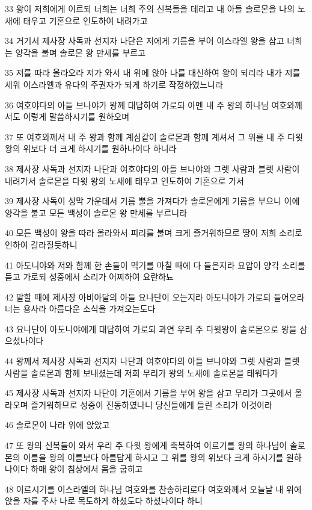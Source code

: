 \par 33 왕이 저희에게 이르되 너희는 너희 주의 신복들을 데리고 내 아들 솔로몬을 나의 노새에 태우고 기혼으로 인도하여 내려가고
\par 34 거기서 제사장 사독과 선지자 나단은 저에게 기름을 부어 이스라엘 왕을 삼고 너희는 양각을 불며 솔로몬 왕 만세를 부르고
\par 35 저를 따라 올라오라 저가 와서 내 위에 앉아 나를 대신하여 왕이 되리라 내가 저를 세워 이스라엘과 유다의 주권자가 되게 하기로 작정하였느니라
\par 36 여호야다의 아들 브나야가 왕께 대답하여 가로되 아멘 내 주 왕의 하나님 여호와께서도 이렇게 말씀하시기를 원하오며
\par 37 또 여호와께서 내 주 왕과 함께 계심같이 솔로몬과 함께 계셔서 그 위를 내 주 다윗 왕의 위보다 더 크게 하시기를 원하나이다 하니라
\par 38 제사장 사독과 선지자 나단과 여호야다의 아들 브나야와 그렛 사람과 블렛 사람이 내려가서 솔로몬을 다윗 왕의 노새에 태우고 인도하여 기혼으로 가서
\par 39 제사장 사독이 성막 가운데서 기름 뿔을 가져다가 솔로몬에게 기름을 부으니 이에 양각을 불고 모든 백성이 솔로몬 왕 만세를 부르니라
\par 40 모든 백성이 왕을 따라 올라와서 피리를 불며 크게 즐거워하므로 땅이 저희 소리로 인하여 갈라질듯하니
\par 41 아도니야와 저와 함께 한 손들이 먹기를 마칠 때에 다 들은지라 요압이 양각 소리를 듣고 가로되 성중에서 소리가 어찌하여 요란하뇨
\par 42 말할 때에 제사장 아비아달의 아들 요나단이 오는지라 아도니야가 가로되 들어오라 너는 용사라 아름다운 소식을 가져오는도다
\par 43 요나단이 아도니야에게 대답하여 가로되 과연 우리 주 다윗왕이 솔로몬으로 왕을 삼으셨나이다
\par 44 왕께서 제사장 사독과 선지자 나단과 여호야다의 아들 브나야와 그렛 사람과 블렛 사람을 솔로몬과 함께 보내셨는데 저희 무리가 왕의 노새에 솔로몬을 태워다가
\par 45 제사장 사독과 선지자 나단이 기혼에서 기름을 부어 왕을 삼고 무리가 그곳에서 올라오며 즐거워하므로 성중이 진동하였나니 당신들에게 들린 소리가 이것이라
\par 46 솔로몬이 나라 위에 앉았고
\par 47 또 왕의 신복들이 와서 우리 주 다윗 왕에게 축복하여 이르기를 왕의 하나님이 솔로몬의 이름을 왕의 이름보다 아름답게 하시고 그 위를 왕의 위보다 크게 하시기를 원하나이다 하매 왕이 침상에서 몸을 굽히고
\par 48 이르시기를 이스라엘의 하나님 여호와를 찬송하리로다 여호와께서 오늘날 내 위에 앉을 자를 주사 나로 목도하게 하셨도다 하셨나이다 하니
